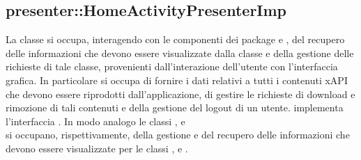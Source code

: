 \documentclass[../Tesi.tex]{subfiles}
\begin{document}
		\subsection{presenter::HomeActivityPresenterImp}
		La classe  si occupa, interagendo con le componenti dei package  e , del recupero delle informazioni che devono essere visualizzate dalla classe  e della gestione delle richieste di tale classe, provenienti dall'interazione dell'utente con l'interfaccia grafica. In particolare si occupa di fornire i dati relativi a tutti i contenuti xAPI che devono essere riprodotti dall'applicazione, di gestire le richieste di download e rimozione di tali contenuti e della gestione del logout di un utente.  implementa l'interfaccia . In modo analogo le classi ,  e \\  si occupano, rispettivamente, della gestione e del recupero delle informazioni che devono essere visualizzate per le classi ,  e .
\end{document}
